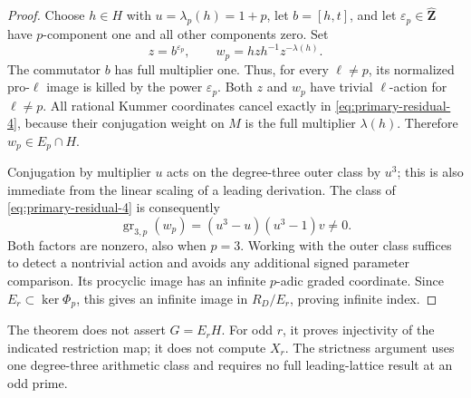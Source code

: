 \begin{proof}
Choose \(h\in H\) with \(u=\lambda_p(h)=1+p\), let
\(b=[h,t]\), and let \(\varepsilon_p\in\widehat{\mathbf Z}\)
have \(p\)-component one and all other components zero.
Set
\begin{equation}
 z=b^{\varepsilon_p},\qquad
 w_p=hzh^{-1}z^{-\lambda(h)}.                            \label{eq:primary-residual-4}
\end{equation}
The commutator \(b\) has full multiplier one.
Thus, for every \(\ell\ne p\), its normalized pro-\(\ell\)
image is killed by the power \(\varepsilon_p\).
Both \(z\) and \(w_p\) have trivial \(\ell\)-action for
\(\ell\ne p\).
All rational Kummer coordinates cancel exactly in \eqref{eq:primary-residual-4},
because their conjugation weight on \(M\) is the full
multiplier \(\lambda(h)\). Therefore \(w_p\in E_p\cap H\).

Conjugation by multiplier \(u\) acts on the degree-three
outer class by \(u^3\); this is also immediate from the
linear scaling of a leading derivation.
The class of \eqref{eq:primary-residual-4} is consequently
\begin{equation}
 \operatorname{gr}_{3,p}(w_p)
      =(u^3-u)(u^3-1)v\ne0.                             \label{eq:primary-residual-5}
\end{equation}
Both factors are nonzero, also when \(p=3\).
Working with the outer class suffices to detect a
nontrivial action and avoids any additional signed
parameter comparison.
Its procyclic image has an infinite \(p\)-adic graded
coordinate.
Since \(E_r\subset\ker\Phi_p\), this gives an infinite
image in \(R_D/E_r\), proving infinite index.
\end{proof}

\begin{remark}
The theorem does not assert \(G=E_rH\).
For odd \(r\), it proves injectivity of the indicated
restriction map; it does not compute \(X_r\).
The strictness argument uses one degree-three arithmetic
class and requires no full leading-lattice result at an
odd prime.
\end{remark}
